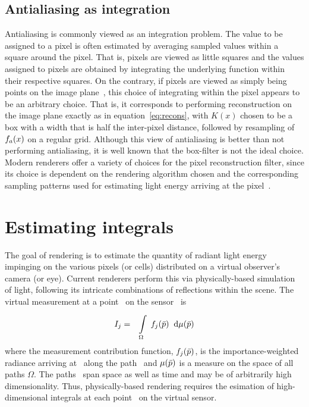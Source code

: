 \documentclass[11pt,fleqn]{book} %
\newcommand{\TBC} {\noindent [TO BE COMPLETED IN THE FINAL VERSION.] }
\begin{document}
\section{Antialiasing as integration}
Antialiasing is commonly viewed as an integration problem. The value to be assigned to a pixel is often estimated by averaging sampled values within a square around the pixel. That is, pixels are viewed as little squares and the values assigned to pixels are obtained by integrating the underlying function within their respective squares. On the contrary, if pixels are viewed as simply being points on the image plane~\cite{smith1995pixel}, this choice of integrating within the pixel appears to be an arbitrary choice. That is, it corresponds to performing reconstruction on the image plane exactly as in equation~\ref{eq:recons}, with $K(x)$ chosen to be a box with a width that is half the inter-pixel distance, followed by resampling of ${f}_a(x)$ on a regular grid. Although this view of antialiasing is better than not performing antialiasing, it is well known that the box-filter is not the ideal choice. Modern renderers offer a variety of choices for the pixel reconstruction filter, since its choice is dependent on the rendering algorithm chosen and the corresponding sampling patterns used for estimating light energy arriving at the pixel~\cite[section~7.6]{Pharr:2010:PBR:1854996}.

\TBC
\chapter{Estimating integrals}
The goal of rendering is to estimate the quantity of radiant light energy impinging on the various pixels (or cells) distributed on a virtual observer's camera (or eye). Current renderers perform this via physically-based simulation of light, following its intricate combinations of reflections within the scene. The virtual measurement \Ij {\xs} at a point \xs\  on the sensor~\cite{VeachChapter8} is
\begin{eqnarray} \label{eq:measeq}
 I_{j} & = & \displaystyle\int\limits_{\Omega}^{} \; f_{j}(\bar{p}) \;\; \mathrm{d}\mu(\bar{p})
\end{eqnarray}
where the measurement contribution function, $f_{j}(\bar{p})$, is the importance-weighted radiance arriving at \xs\ along the path \pth\ and $\mu(\bar{p})$ is a measure on the space of all paths $\Omega$. The paths \pth\ span space as well as time and may be of arbitrarily high dimensionality. Thus, physically-based rendering requires the esimation of high-dimensional integrals at each point \xs\ on the virtual sensor. 
\end{document}

